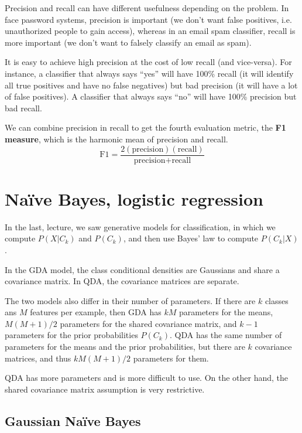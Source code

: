 \documentclass[a4paper,12pt]{article}
\begin{document}
Precision and recall can have different usefulness depending on the problem. In face password systems, precision is important (we don't want false positives, i.e. unauthorized people to gain access), whereas in an email spam classifier, recall is more important (we don't want to falsely classify an email as spam). 

It is easy to achieve high precision at the cost of low recall (and vice-versa). For instance, a classifier that always says ``yes'' will have 100\% recall (it will identify all true positives and have no false negatives) but bad precision (it will have a lot of false positives). A classifier that always says ``no'' will have 100\% precision but bad recall. 

We can combine precision in recall to get the fourth evaluation metric, the \textbf{F1 measure}, which is the harmonic mean of precision and recall. 
$$\text{F1} = \frac{2(\text{precision})(\text{recall})}{\text{precision}+\text{recall}}$$


\clearpage

\section{Naïve Bayes, logistic regression}

In the last, lecture, we saw generative models for classification, in which we compute $P(X|C_k)$ and $P(C_k)$, and then use Bayes' law to compute $P(C_k|X)$. 

In the GDA model, the class conditional densities are Gaussians and share a covariance matrix. In QDA, the covariance matrices are separate. 

The two models also differ in their number of parameters. If there are $k$ classes ans $M$ features per example, then GDA has $kM$ parameters for the means, $M(M+1)/2$ parameters for the shared covariance matrix, and $k-1$ parameters for the prior probabilities $P(C_k)$. QDA has the same number of parameters for the means and the prior probabilities, but there are $k$ covariance matrices, and thus $kM(M+1)/2$ parameters for them. 

QDA has more parameters and is more difficult to use. On the other hand, the shared covariance matrix assumption is very restrictive. 

\subsection{Gaussian Naïve Bayes}
\end{document}
